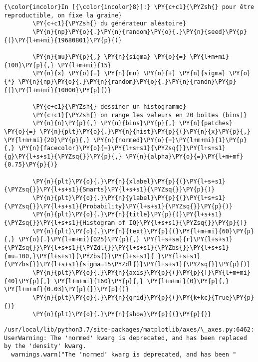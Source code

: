     \begin{Verbatim}[commandchars=\\\{\},frame=single,framerule=0.3mm,rulecolor=\color{cellframecolor}]
{\color{incolor}In [{\color{incolor}8}]:} \PY{c+c1}{\PYZsh{} pour être reproductible, on fixe la graine}
        \PY{c+c1}{\PYZsh{} du générateur aléatoire}
        \PY{n}{np}\PY{o}{.}\PY{n}{random}\PY{o}{.}\PY{n}{seed}\PY{p}{(}\PY{l+m+mi}{19680801}\PY{p}{)}
        
        \PY{n}{mu}\PY{p}{,} \PY{n}{sigma} \PY{o}{=} \PY{l+m+mi}{100}\PY{p}{,} \PY{l+m+mi}{15}
        \PY{n}{x} \PY{o}{=} \PY{n}{mu} \PY{o}{+} \PY{n}{sigma} \PY{o}{*} \PY{n}{np}\PY{o}{.}\PY{n}{random}\PY{o}{.}\PY{n}{randn}\PY{p}{(}\PY{l+m+mi}{10000}\PY{p}{)}
        
        \PY{c+c1}{\PYZsh{} dessiner un histogramme}
        \PY{c+c1}{\PYZsh{} on range les valeurs en 20 boites (bins)}
        \PY{n}{n}\PY{p}{,} \PY{n}{bins}\PY{p}{,} \PY{n}{patches} \PY{o}{=} \PY{n}{plt}\PY{o}{.}\PY{n}{hist}\PY{p}{(}\PY{n}{x}\PY{p}{,} \PY{l+m+mi}{20}\PY{p}{,} \PY{n}{normed}\PY{o}{=}\PY{l+m+mi}{1}\PY{p}{,} \PY{n}{facecolor}\PY{o}{=}\PY{l+s+s1}{\PYZsq{}}\PY{l+s+s1}{g}\PY{l+s+s1}{\PYZsq{}}\PY{p}{,} \PY{n}{alpha}\PY{o}{=}\PY{l+m+mf}{0.75}\PY{p}{)}
        
        \PY{n}{plt}\PY{o}{.}\PY{n}{xlabel}\PY{p}{(}\PY{l+s+s1}{\PYZsq{}}\PY{l+s+s1}{Smarts}\PY{l+s+s1}{\PYZsq{}}\PY{p}{)}
        \PY{n}{plt}\PY{o}{.}\PY{n}{ylabel}\PY{p}{(}\PY{l+s+s1}{\PYZsq{}}\PY{l+s+s1}{Probability}\PY{l+s+s1}{\PYZsq{}}\PY{p}{)}
        \PY{n}{plt}\PY{o}{.}\PY{n}{title}\PY{p}{(}\PY{l+s+s1}{\PYZsq{}}\PY{l+s+s1}{Histogram of IQ}\PY{l+s+s1}{\PYZsq{}}\PY{p}{)}
        \PY{n}{plt}\PY{o}{.}\PY{n}{text}\PY{p}{(}\PY{l+m+mi}{60}\PY{p}{,} \PY{o}{.}\PY{l+m+mi}{025}\PY{p}{,} \PY{l+s+sa}{r}\PY{l+s+s1}{\PYZsq{}}\PY{l+s+s1}{\PYZdl{}}\PY{l+s+s1}{\PYZbs{}}\PY{l+s+s1}{mu=100,}\PY{l+s+s1}{\PYZbs{}}\PY{l+s+s1}{ }\PY{l+s+s1}{\PYZbs{}}\PY{l+s+s1}{sigma=15\PYZdl{}}\PY{l+s+s1}{\PYZsq{}}\PY{p}{)}
        \PY{n}{plt}\PY{o}{.}\PY{n}{axis}\PY{p}{(}\PY{p}{[}\PY{l+m+mi}{40}\PY{p}{,} \PY{l+m+mi}{160}\PY{p}{,} \PY{l+m+mi}{0}\PY{p}{,} \PY{l+m+mf}{0.03}\PY{p}{]}\PY{p}{)}
        \PY{n}{plt}\PY{o}{.}\PY{n}{grid}\PY{p}{(}\PY{k+kc}{True}\PY{p}{)}
        \PY{n}{plt}\PY{o}{.}\PY{n}{show}\PY{p}{(}\PY{p}{)}
\end{Verbatim}


    \begin{Verbatim}[commandchars=\\\{\},frame=single,framerule=0.3mm,rulecolor=\color{cellframecolor}]
/usr/local/lib/python3.7/site-packages/matplotlib/axes/\_axes.py:6462: UserWarning: The 'normed' kwarg is deprecated, and has been replaced by the 'density' kwarg.
  warnings.warn("The 'normed' kwarg is deprecated, and has been "
\end{Verbatim}

